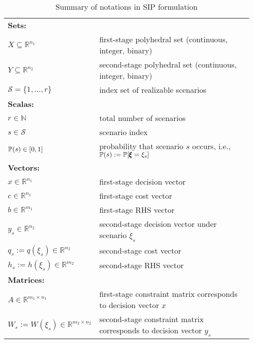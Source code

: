 \begin{table}[]
	\resizebox{\textwidth}{!}
	{
		\begin{threeparttable}
			\caption{Summary of notations in SIP formulation}
			\label{notation:SIP}
			\begin{tabular}{ll}
				\toprule
				\multicolumn{2}{l}{\textbf{Sets:}} \\ 
				$X\subseteq\mathbb{R}^{n_1}$	& first-stage polyhedral set (continuous, integer, binary)\\
				$Y\subseteq\mathbb{R}^{n_2}$	& second-stage polyhedral set (continuous, integer, binary)\\ 
				$\mathcal{S}=\{1,\ldots,r\}$	& index set of realizable scenarios \\ \midrule
				\multicolumn{2}{l}{\textbf{Scalas:}} \\ 
				$r\in\mathbb{N}$	& total number of scenarios	\\	
				$s\in\mathcal{S}$	& scenario index 	\\
				$\operatorname*{\mathbb{P}}(s)\in[0,1]$ & probability that scenario $s$ occurs, i.e., $\operatorname*{\mathbb{P}}(s):=\operatorname*{\mathbb{P}}[\pmb{\xi}=\xi_s]$ \\ \midrule
				\multicolumn{2}{l}{\textbf{Vectors:}} \\  
				$x\in\mathbb{R}^{n_1}$	& first-stage decision vector	\\
				$c\in \mathbb{R}^{n_1}$	& first-stage cost vector\\
				$b\in\mathbb{R}^{m_1}$	& first-stage RHS vector\\
				$y_s\in\mathbb{R}^{n_2}$	& second-stage decision vector under scenario $\xi_s$	\\
				$q_s:= q(\xi_s)\in\mathbb{R}^{n_2}$	& second-stage cost vector \\
				$h_s:= h(\xi_s)\in\mathbb{R}^{m_2}$	& second-stage RHS vector\\ \midrule
				\multicolumn{2}{l}{\textbf{Matrices:}} \\  
				$A\in\mathbb{R}^{m_1\times n_1}$	& first-stage constraint matrix corresponds to decision vector $x$\\
				$W_s:= W(\xi_s)\in\mathbb{R}^{m_2\times n_2}$	& second-stage constraint matrix corresponds to decision vector $y_s$\\

\end{tabular}
\end{threeparttable}}
\end{table}
